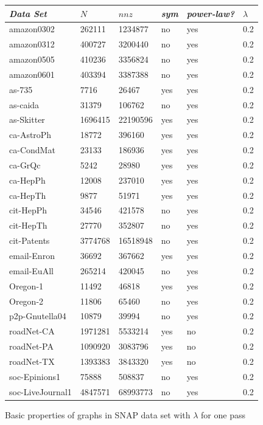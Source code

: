 \documentclass[11pt]{article}
\begin{document}
\begin{figure}
\caption{Basic properties of graphs in SNAP data set with $\lambda$ for one pass}
\centering
{ \begin{tabular}{ *6l }    \toprule
\emph{Data Set} & $N$ & $nnz$ & \emph{sym} & \emph{power-law?} & $\lambda$ \\\midrule 
amazon0302 & 262111 & 1234877 & no & yes & 0.2\\ 
amazon0312 & 400727 & 3200440 & no & yes & 0.2\\ 
amazon0505 & 410236 & 3356824 & no & yes & 0.2\\ 
amazon0601 & 403394 & 3387388 & no & yes & 0.2\\ 
as-735 & 7716 & 26467 & yes & yes & 0.2\\ 
as-caida & 31379 & 106762 & no & yes & 0.2\\ 
as-Skitter & 1696415 & 22190596 & yes & yes & 0.2\\ 
ca-AstroPh & 18772 & 396160 & yes & yes & 0.2\\ 
ca-CondMat & 23133 & 186936 & yes & yes & 0.2\\ 
ca-GrQc & 5242 & 28980 & yes & yes & 0.2\\ 
ca-HepPh & 12008 & 237010 & yes & yes & 0.2\\ 
ca-HepTh & 9877 & 51971 & yes & yes & 0.2\\ 
cit-HepPh & 34546 & 421578 & no & yes & 0.2\\ 
cit-HepTh & 27770 & 352807 & no & yes & 0.2\\ 
cit-Patents & 3774768 & 16518948 & no & yes & 0.2\\ 
email-Enron & 36692 & 367662 & yes & yes & 0.2\\ 
email-EuAll & 265214 & 420045 & no & yes & 0.2\\ 
Oregon-1 & 11492 & 46818 & yes & yes & 0.2\\ 
Oregon-2 & 11806 & 65460 & no & yes & 0.2\\ 
p2p-Gnutella04 & 10879 & 39994 & no & yes & 0.2\\ 
roadNet-CA & 1971281 & 5533214 & yes & no & 0.2\\ 
roadNet-PA & 1090920 & 3083796 & yes & no & 0.2\\ 
roadNet-TX & 1393383 & 3843320 & yes & no & 0.2\\ 
soc-Epinions1 & 75888 & 508837 & no & yes & 0.2\\ 
soc-LiveJournal1 & 4847571 & 68993773 & no & yes & 0.2\\ 

\end{tabular}}
\end{figure}
\end{document}
